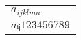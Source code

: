 \documentclass{minimal}
\begin{document}

\begin{tabular}{l}
   $a_{ijklmn}$ \\
   $aᵢⱼ123456789$ \\
\end{tabular}
%
%
%
%

\end{document}

